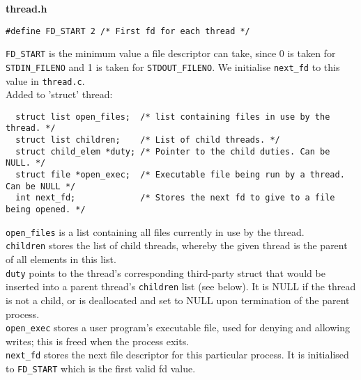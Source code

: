 \documentclass[11pt, a4paper]{article}
\begin{document}
\begin{center}\textbf{thread.h}\end{center}

\begin{verbatim}
#define FD_START 2 /* First fd for each thread */
\end{verbatim}
\verb|FD_START| is the minimum value a file descriptor can take, since 0 is taken for 
\verb|STDIN_FILENO| and 1 is taken for \verb|STDOUT_FILENO|. We initialise \verb|next_fd| to this
value in \verb|thread.c|.\bigskip\\
Added to 'struct' thread:
\begin{verbatim}
  struct list open_files;  /* list containing files in use by the thread. */
  struct list children;    /* List of child threads. */
  struct child_elem *duty; /* Pointer to the child duties. Can be NULL. */    
  struct file *open_exec;  /* Executable file being run by a thread. Can be NULL */
  int next_fd;             /* Stores the next fd to give to a file being opened. */
\end{verbatim}
\verb|open_files| is a list containing all files currently in use by the thread.\\
\verb|children| stores the list of child threads, whereby the given thread 
is the parent of all elements in this list.\\
\verb|duty| points to the thread's corresponding third-party struct that would be inserted
into a parent thread's \verb|children| list (see below). It is NULL if the thread is not a
child, or is deallocated and set to NULL upon termination of the parent process.\\
\verb|open_exec| stores a user program's executable file, used for denying and allowing
writes; this is freed
when the process exits.\\
\verb|next_fd| stores the next file descriptor for this particular process. It
is initialised to \verb|FD_START| which is the first valid fd value.
\end{document}
